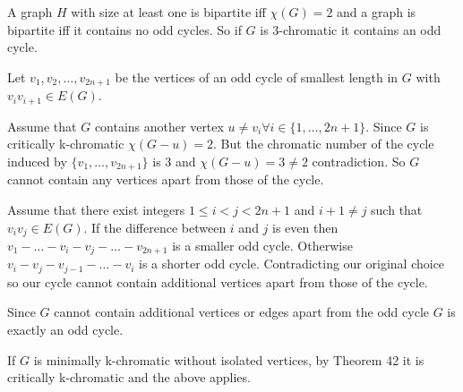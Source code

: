A graph $H$ with size at least one is bipartite iff $\chi(G) = 2$ 
and a graph is bipartite iff it contains no odd cycles. 
So if $G$ is 3-chromatic it contains an odd cycle.

Let $v_1, v_2, \ldots, v_{2n+1}$ be the vertices of an odd
cycle of smallest length in $G$ with $v_iv_{i+1} \in E(G)$. 

Assume that $G$
contains another vertex $u \ne v_i \forall i \in \{1, \ldots, 2n+1\}$.
Since $G$ is
critically k-chromatic $\chi(G-u) = 2$. But the chromatic number of the
cycle induced by $\{ v_1, \ldots, v_{2n+1} \}$ is 3
and $\chi(G-u) = 3 \ne 2$ contradiction. So $G$ cannot contain any
vertices apart from those of the cycle.

Assume that there exist integers $1 \le i < j < 2n+1$ and $i+1 \ne j$ such
that $v_iv_j \in E(G)$. If the difference between $i$ and $j$
is even then $v_1 - \ldots - v_i - v_j - \ldots - v_{2n+1}$
is a smaller odd cycle. Otherwise
$v_i - v_j - v_{j-1} - \ldots -  v_i$ is a shorter odd cycle.
Contradicting our original choice so our cycle cannot contain
additional vertices apart from those of the cycle.

Since $G$ cannot contain additional vertices or edges apart from the
odd cycle $G$ is exactly an odd cycle.

If $G$ is minimally k-chromatic without isolated vertices, by Theorem
42 it is critically k-chromatic and the above applies.
